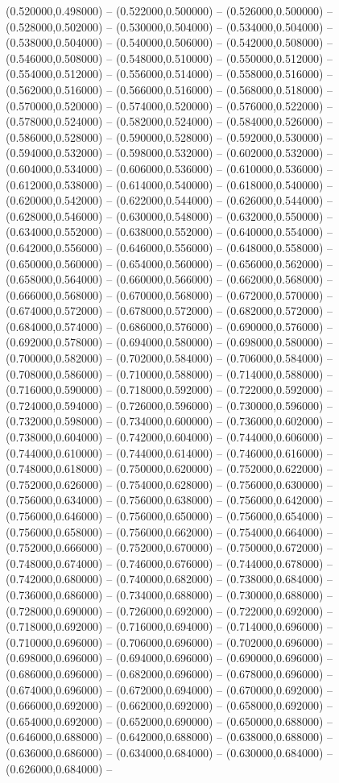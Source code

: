 (0.520000,0.498000) -- (0.522000,0.500000) -- (0.526000,0.500000) -- (0.528000,0.502000) -- (0.530000,0.504000) -- (0.534000,0.504000) -- (0.538000,0.504000) -- (0.540000,0.506000) -- (0.542000,0.508000) -- (0.546000,0.508000) -- (0.548000,0.510000) -- (0.550000,0.512000) -- (0.554000,0.512000) -- (0.556000,0.514000) -- (0.558000,0.516000) -- (0.562000,0.516000) -- (0.566000,0.516000) -- (0.568000,0.518000) -- (0.570000,0.520000) -- (0.574000,0.520000) -- (0.576000,0.522000) -- (0.578000,0.524000) -- (0.582000,0.524000) -- (0.584000,0.526000) -- (0.586000,0.528000) -- (0.590000,0.528000) -- (0.592000,0.530000) -- (0.594000,0.532000) -- (0.598000,0.532000) -- (0.602000,0.532000) -- (0.604000,0.534000) -- (0.606000,0.536000) -- (0.610000,0.536000) -- (0.612000,0.538000) -- (0.614000,0.540000) -- (0.618000,0.540000) -- (0.620000,0.542000) -- (0.622000,0.544000) -- (0.626000,0.544000) -- (0.628000,0.546000) -- (0.630000,0.548000) -- (0.632000,0.550000) -- (0.634000,0.552000) -- (0.638000,0.552000) -- (0.640000,0.554000) -- (0.642000,0.556000) -- (0.646000,0.556000) -- (0.648000,0.558000) -- (0.650000,0.560000) -- (0.654000,0.560000) -- (0.656000,0.562000) -- (0.658000,0.564000) -- (0.660000,0.566000) -- (0.662000,0.568000) -- (0.666000,0.568000) -- (0.670000,0.568000) -- (0.672000,0.570000) -- (0.674000,0.572000) -- (0.678000,0.572000) -- (0.682000,0.572000) -- (0.684000,0.574000) -- (0.686000,0.576000) -- (0.690000,0.576000) -- (0.692000,0.578000) -- (0.694000,0.580000) -- (0.698000,0.580000) -- (0.700000,0.582000) -- (0.702000,0.584000) -- (0.706000,0.584000) -- (0.708000,0.586000) -- (0.710000,0.588000) -- (0.714000,0.588000) -- (0.716000,0.590000) -- (0.718000,0.592000) -- (0.722000,0.592000) -- (0.724000,0.594000) -- (0.726000,0.596000) -- (0.730000,0.596000) -- (0.732000,0.598000) -- (0.734000,0.600000) -- (0.736000,0.602000) -- (0.738000,0.604000) -- (0.742000,0.604000) -- (0.744000,0.606000) -- (0.744000,0.610000) -- (0.744000,0.614000) -- (0.746000,0.616000) -- (0.748000,0.618000) -- (0.750000,0.620000) -- (0.752000,0.622000) -- (0.752000,0.626000) -- (0.754000,0.628000) -- (0.756000,0.630000) -- (0.756000,0.634000) -- (0.756000,0.638000) -- (0.756000,0.642000) -- (0.756000,0.646000) -- (0.756000,0.650000) -- (0.756000,0.654000) -- (0.756000,0.658000) -- (0.756000,0.662000) -- (0.754000,0.664000) -- (0.752000,0.666000) -- (0.752000,0.670000) -- (0.750000,0.672000) -- (0.748000,0.674000) -- (0.746000,0.676000) -- (0.744000,0.678000) -- (0.742000,0.680000) -- (0.740000,0.682000) -- (0.738000,0.684000) -- (0.736000,0.686000) -- (0.734000,0.688000) -- (0.730000,0.688000) -- (0.728000,0.690000) -- (0.726000,0.692000) -- (0.722000,0.692000) -- (0.718000,0.692000) -- (0.716000,0.694000) -- (0.714000,0.696000) -- (0.710000,0.696000) -- (0.706000,0.696000) -- (0.702000,0.696000) -- (0.698000,0.696000) -- (0.694000,0.696000) -- (0.690000,0.696000) -- (0.686000,0.696000) -- (0.682000,0.696000) -- (0.678000,0.696000) -- (0.674000,0.696000) -- (0.672000,0.694000) -- (0.670000,0.692000) -- (0.666000,0.692000) -- (0.662000,0.692000) -- (0.658000,0.692000) -- (0.654000,0.692000) -- (0.652000,0.690000) -- (0.650000,0.688000) -- (0.646000,0.688000) -- (0.642000,0.688000) -- (0.638000,0.688000) -- (0.636000,0.686000) -- (0.634000,0.684000) -- (0.630000,0.684000) -- (0.626000,0.684000) -- 